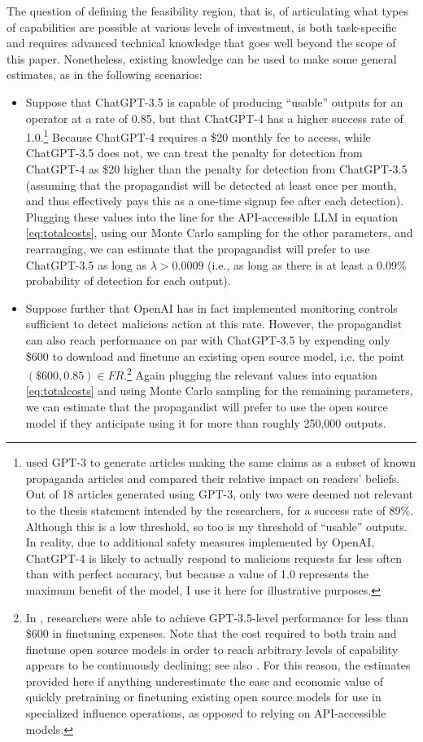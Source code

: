 \documentclass{article}
\begin{document}
The question of defining the feasibility region, that is, of articulating what types of capabilities are possible at various levels of investment, is both task-specific and requires advanced technical knowledge that goes well beyond the scope of this paper. Nonetheless, existing knowledge can be used to make some general estimates, as in the following scenarios:

\begin{itemize}
  \item Suppose that ChatGPT-3.5 is capable of producing ``usable'' outputs for an operator at a rate of 0.85, but that ChatGPT-4 has a higher success rate of 1.0.\footnote{\cite{surveyresearch} used GPT-3 to generate articles making the same claims as a subset of known propaganda articles and compared their relative impact on readers' beliefs. Out of 18 articles generated using GPT-3, only two were deemed not relevant to the thesis statement intended by the researchers, for a success rate of 89\%. Although this is a low threshold, so too is my threshold of ``usable'' outputs. In reality, due to additional safety measures implemented by OpenAI, ChatGPT-4 is likely to actually respond to malicious requests far less often than with perfect accuracy, but because a value of 1.0 represents the maximum benefit of the model, I use it here for illustrative purposes.} Because ChatGPT-4 requires a \$20 monthly fee to access, while ChatGPT-3.5 does not, we can treat the penalty for detection from ChatGPT-4 as \$20 higher than the penalty for detection from ChatGPT-3.5 (assuming that the propagandist will be detected at least once per month, and thus effectively pays this as a one-time signup fee after each detection). Plugging these values into the line for the API-accessible LLM in equation \ref{eq:totalcosts}, using our Monte Carlo sampling for the other parameters, and rearranging, we can estimate that the propagandist will prefer to use ChatGPT-3.5 as long as $\lambda > 0.0009$ (i.e., as long as there is at least a 0.09\% probability of detection for each output). 
  \item Suppose further that OpenAI has in fact implemented monitoring controls sufficient to detect malicious action at this rate. However, the propagandist can also reach performance on par with ChatGPT-3.5 by expending only \$600 to download and finetune an existing open source model, i.e. the point $(\$600, 0.85) \in FR$.\footnote{In \cite{alpaca}, researchers were able to achieve GPT-3.5-level performance for less than \$600 in finetuning expenses. Note that the cost required to both train and finetune open source models in order to reach arbitrary levels of capability appears to be continuously declining; see also \cite{mosaic}. For this reason, the estimates provided here if anything underestimate the ease and economic value of quickly pretraining or finetuning existing open source models for use in specialized influence operations, as opposed to relying on API-accessible models.} Again plugging the relevant values into equation \ref{eq:totalcosts} and using Monte Carlo sampling for the remaining parameters, we can estimate that the propagandist will prefer to use the open source model if they anticipate using it for more than roughly 250,000 outputs. 

\end{itemize}
\end{document}
